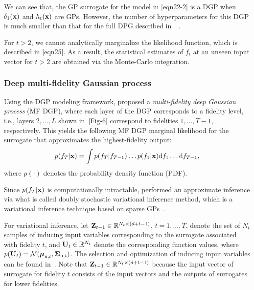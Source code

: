 \documentclass[journal ]{new-aiaa}
\begin{document}
We can see that, the GP surrogate for the model in \cref{eqn22-2} is a DGP when $\delta_1(\bf x)$ and $h_{t}(\bf x)$ are GPs.
However, the number of hyperparameters for this DGP is much smaller than that for the full DPG described in~~\citep{Perdikaris2017}. 
  
For $t>2$, we cannot analytically marginalize the likelihood function, which is described in \cref{eqn25}.
As a result, the statistical estimates of $f_{t}$ at an unseen input vector for $t>2$ are obtained via the Monte-Carlo integration.

\subsubsection{Deep multi-fidelity Gaussian process}\label{Sec453}

Using the DGP modeling framework, \citet{Cutajar2019} proposed a \textit{multi-fidelity deep Gaussian process} (MF DGP),
where each layer of the DGP corresponds to a fidelity level, i.e., layers $2,\dots,L$ shown in~\cref{Fig-6}
correspond to fidelities $1,\dots,T-1$, respectively.
This yields the following MF DGP marginal likelihood for the surrogate that approximates the highest-fidelity output:
\begin{equation}\label{eqn25}
	p(f_{T}|{\bf x}) = \int p(f_{T}|f_{T-1})\dots p(f_{1}|{\bf x}) \text{d}f_{1} \dots \text{d}f_{T-1},
\end{equation}
where $p(\cdot)$ denotes the probability density function (PDF).

Since $p(f_{T}|{\bf x})$ is computationally intractable, \citet{Cutajar2019} performed an approximate inference via what is called doubly stochastic variational inference method, which is a variational inference technique based on sparse GPs~\citep{Salimbeni2017}.

For variational inference, let  ${\bf Z}_{t-1} \in \mathbb{R}^{N_t \times {(d+t-1)}}$, $t=1,\dots,T$, denote the set of $N_t$ samples of inducing input variables corresponding to the surrogate associated with fidelity $t$, and ${\bf U}_{t} \in \mathbb{R}^{N_t}$ denote the corresponding function values, where $p({\bf U}_{t}) = \mathcal{N}({\boldsymbol \mu}_{\text{u},t},{\boldsymbol \Sigma}_{\text{u},t})$.
The selection and optimization of inducing input variables can be found in~\citet{Titsias2009}.
Note that ${\bf Z}_{t-1} \in \mathbb{R}^{N_t \times {(d+t-1)}}$ because the input vector of surrogate for fidelity $t$ consists of the input vectors and the outputs of surrogates for lower fidelities.
\end{document}
